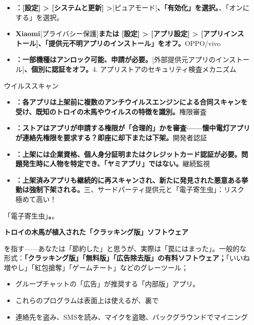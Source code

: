 \begin{itemize}
  \item \textbf{：[設定] > [システムと更新] >}[ピュアモード]\textbf{、「有効化」を選択。}、「オンにする」を選択。
  \item \textbf{Xiaomi}[プライバシー保護]\textbf{または [設定] > [アプリ設定] > [アプリインストール]、「提供元不明アプリのインストール」をオフ。}OPPO/vivo
  \item \textbf{：一部機種はアンロック可能、申請が必要。}[外部提供元アプリのインストール]\textbf{、個別に認証をオフ。}4. アプリストアのセキュリティ検査メカニズム
\end{itemize}


ウイルススキャン

\begin{itemize}
  \item \textbf{：各アプリは上架前に複数のアンチウイルスエンジンによる合同スキャンを受け、既知のトロイの木馬やウイルスの特徴を識別。}権限審査
  \item \textbf{：ストアはアプリが申請する権限が「合理的」かを審査——懐中電灯アプリが連絡先権限を要求する？即座に却下または下架。}開発者認証
  \item \textbf{：上架には企業資格、個人身分証明またはクレジットカード認証が必要。問題発生時に人物を特定でき、「ヤミアプリ」ではない。}継続監視
  \item \textbf{：上架済みアプリも継続的に再スキャンされ、新たに発見された悪意ある挙動は強制下架される。}三、サードパーティ提供元と「電子寄生虫」：リスク極めて高い！
\end{itemize}


「電子寄生虫」\textbf{。}。

\textbf{トロイの木馬が植入された「クラッキング版」ソフトウェア}\par

を指す——あなたは「節約した」と思うが、実際は「罠にはまった」。一般的な形式：\textbf{「クラッキング版」「無料版」「広告除去版」の有料ソフトウェア；}「いいね増やし」「紅包搶奪」「ゲームチート」などのグレーツール；

\begin{itemize}
  \item グループチャットの「広告」が推奨する「内部版」アプリ。
  \item これらのプログラムは表面上は使えるが、裏で
  \item 連絡先を盗み、SMSを読み、マイクを盗聴、バックグラウンドでマイニング
\end{itemize}

